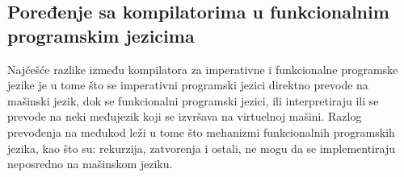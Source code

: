 \subsection{Poređenje sa kompilatorima u funkcionalnim programskim jezicima}
Najčešće razlike između kompilatora za imperativne i funkcionalne programske jezike je u tome što se imperativni programski jezici direktno prevode na mašinski jezik, dok se funkcionalni programski jezici, ili interpretiraju ili se prevode na neki međujezik koji se izvršava na virtuelnoj mašini. Razlog prevođenja na međukod leži u tome što mehanizmi funkcionalnih programskih jezika, kao što su: rekurzija, zatvorenja i ostali, ne mogu da se implementiraju neposredno na mašinskom jeziku.

